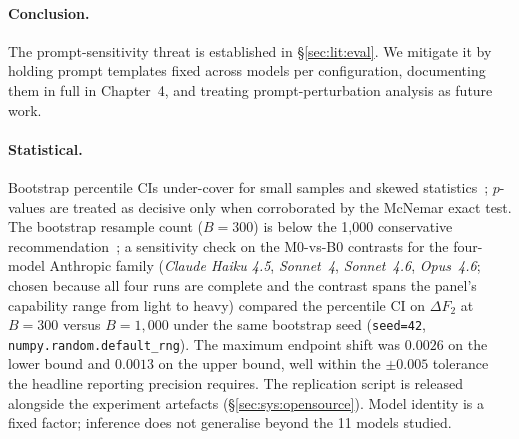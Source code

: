 \paragraph{Conclusion.}
The prompt-sensitivity threat is established in \S\ref{sec:lit:eval}.
We mitigate it by holding prompt templates fixed
across models per configuration, documenting them in full in Chapter~4, and treating
prompt-perturbation analysis as future work.

\paragraph{Statistical.} Bootstrap percentile CIs under-cover for small samples and
skewed statistics~\cite{efron1979bootstrap}; $p$-values are treated as decisive only
when corroborated by the McNemar exact test. The bootstrap resample count ($B{=}300$)
is below the 1{,}000 conservative recommendation~\cite{dror2018hitchhikers};
a sensitivity check on the M0-vs-B0 contrasts for the four-model Anthropic family
(\textit{Claude Haiku 4.5}, \textit{Sonnet~4}, \textit{Sonnet~4.6}, \textit{Opus~4.6};
chosen because all four runs are complete and the contrast spans the panel's
capability range from light to heavy) compared the percentile CI on
$\Delta F_2$ at $B{=}300$ versus $B{=}1{,}000$ under the same bootstrap seed
(\texttt{seed=42}, \texttt{numpy.random.default\_rng}). The maximum endpoint
shift was $0.0026$ on the lower bound and $0.0013$ on the upper bound, well
within the $\pm 0.005$ tolerance the headline reporting precision requires.
The replication script is released alongside the experiment artefacts
(\S\ref{sec:sys:opensource}). Model identity is a fixed factor; inference does
not generalise beyond the 11 models studied.
